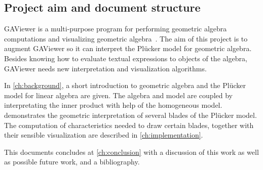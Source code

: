 %


\subsection{Project aim and document structure}

GAViewer is a multi-purpose program for performing geometric algebra computations and visualizing geometric algebra~\cite{GAViewer}.  The aim of this project is to augment GAViewer so it can interpret the Pl\"ucker model for geometric algebra.  Besides knowing how to evaluate textual expressions to objects of the algebra, GAViewer needs new interpretation and visualization algorithms.

In \autoref{ch:background}, a short introduction to geometric algebra and the Pl\"ucker model for linear algebra are given.  The algebra and model are coupled by interpretating the inner product with help of the homogeneous model.   demonstrates the geometric interpretation of several blades of the Pl\"ucker model.  The computation of characteristics needed to draw certain blades, together with their sensible visualization are described in \autoref{ch:implementation}.

This documents concludes at \autoref{ch:conclusion} with a discussion of this work as well as possible future work, and a bibliography.
